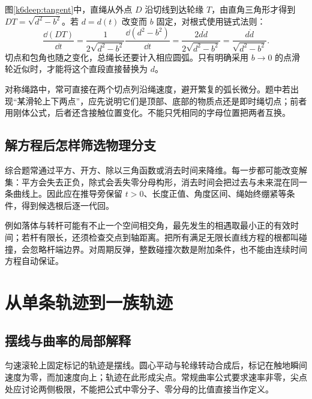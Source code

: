 图\ref{k6deep:tangent}中，直绳从外点 $D$ 沿切线到达轮缘 $T$，由直角三角形才得到 $DT=\sqrt{d^2-b^2}$。若 $d=d(t)$ 改变而 $b$ 固定，对根式使用链式法则：
\[
\frac{\dd(DT)}{\dd t}
=\frac{1}{2\sqrt{d^2-b^2}}\frac{\dd(d^2-b^2)}{\dd t}
=\frac{2d\dot d}{2\sqrt{d^2-b^2}}
=\frac{d\dot d}{\sqrt{d^2-b^2}}.
\]
切点和包角也随之变化，总绳长还要计入相应圆弧。只有明确采用 $b\to0$ 的点滑轮近似时，才能将这个直段直接替换为 $d$。

对称绳路中，常可直接在两个切点列沿绳速度，避开繁复的弧长微分。题中若出现“某滑轮上下两点”，应先说明它们是顶部、底部的物质点还是即时绳切点；前者用刚体公式，后者还含接触位置变化。不能只凭相同的字母位置把两者互换。

\subsection{解方程后怎样筛选物理分支}
综合题常通过平方、开方、除以三角函数或消去时间来降维。每一步都可能改变解集：平方会失去正负，除式会丢失零分母构形，消去时间会把过去与未来混在同一条曲线上。因此应在推导旁保留 $t>0$、长度正值、角度区间、绳始终绷紧等条件，得到候选根后逐一代回。

例如落体与转杆可能有不止一个空间相交角，最先发生的相遇取最小正的有效时间；若杆有限长，还须检查交点到轴距离。把所有满足无限长直线方程的根都叫碰撞，会忽略杆端边界。对周期反弹，整数碰撞次数是附加条件，也不能由连续时间方程自动保证。

\section{从单条轨迹到一族轨迹}
\subsection{摆线与曲率的局部解释}
匀速滚轮上固定标记的轨迹是摆线。圆心平动与轮缘转动合成后，标记在触地瞬间速度为零，而加速度向上；轨迹在此形成尖点。常规曲率公式要求速率非零，尖点处应讨论两侧极限，不能把公式中零分子、零分母的比值直接当作定义。

